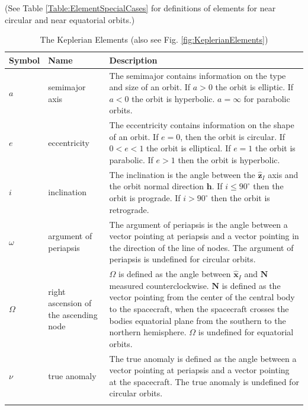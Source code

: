 \begin{table} \caption{The Keplerian Elements (also see Fig. \ref{fig:KeplerianElements})}
\centering {} (See Table
\ref{Table:ElementSpecialCases} for definitions of elements for near
circular and near equatorial orbits.)
\begin{tabular}{p{.5 in} p{1.5 in} p{3.5 in}}
  \hline\hline
   Symbol & Name & Description \\
  \hline
  $a$ & semimajor axis & The semimajor contains information on the type and size of an orbit.
  If $a>0$ the orbit is elliptic.  If $a < 0$ the orbit is hyperbolic. $a = \infty$ for parabolic orbits. \\
  $e$ & eccentricity & The eccentricity contains information on the shape of an orbit.  If $e = 0$, then the orbit is circular. If $0 < e < 1$ the orbit is
  elliptical.  If $e = 1$ the orbit is parabolic.  If $e > 1$ then the orbit is hyperbolic. \\
  $i$ & inclination & The inclination is the angle between the $\hat{\mathbf{z}}_I$ axis and the orbit normal direction $\mathbf{h}$.  If $i \leq 90^{\circ}$ then the orbit is prograde.
  If $i > 90^{\circ}$ then the orbit is retrograde.  \\
  $\omega$ & argument of periapsis & The argument of periapsis is the angle between a vector pointing at periapsis  and a vector pointing in the direction of the line of nodes. The argument of periapsis is undefined for circular orbits.\\
  $\Omega$ & right ascension of  the ascending node& $\Omega$ is defined as the angle between $\hat{\mathbf{x}}_I$ and $\mathbf{N}$ measured
  counterclockwise.
    $\mathbf{N}$ is defined as the vector pointing from the center of the central body to the spacecraft, when the spacecraft crosses the bodies equatorial plane
  from the southern to the northern hemisphere.  $\Omega$ is undefined for equatorial orbits.   \\
  $\nu$ & true anomaly & The true anomaly is defined as the angle between a vector pointing at periapsis and a vector pointing at the spacecraft.
  The true anomaly is undefined for circular orbits. \\
  \hline\hline \label{Table:KeplerianElements}
\end{tabular}
\end{table}

